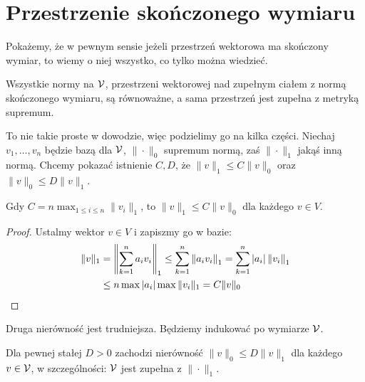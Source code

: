 \section{Przestrzenie skończonego wymiaru}
Pokażemy, że w pewnym sensie jeżeli przestrzeń wektorowa ma skończony wymiar, to wiemy o niej wszystko, co tylko można wiedzieć.

\begin{fakt}
	Wszystkie normy na $\mathcal V$, przestrzeni wektorowej nad zupełnym ciałem z normą skończonego wymiaru, są równoważne, a sama przestrzeń jest zupełna z metryką supremum.
\end{fakt}

To nie takie proste w dowodzie, więc podzielimy go na kilka części.
Niechaj $v_1, \dots, v_n$ będzie bazą dla $\mathcal V$, $\|\cdot\|_0$ supremum normą, zaś $\|\cdot\|_1$ jakąś inną normą.
Chcemy pokazać istnienie $C, D$, że $\|v\|_1 \le C \|v\|_0$ oraz $\|v\|_0 \le D \|v\|_1$.

\begin{lemat}
	Gdy $C = n \max_{1 \le i \le n} \|v_i\|_1$, to $\|v\|_1 \le C \| v \|_0$ dla każdego $v \in V$.
\end{lemat}

\begin{proof}
	Ustalmy wektor $v \in V$ i zapiszmy go w bazie:
	\begin{align*}
	\|v\|_1 & = \left\| \sum_{k=1}^n a_i v_i \right\|_1 \le  \sum_{k=1}^n \left\| a_i v_i \right\|_1 =  \sum_{k=1}^n |a_i|  \left\|  v_i \right\|_1 \\
	& \le n \max |a_i| \max \|v_i\|_1 = C \|v\|_0 \qedhere
	\end{align*}
\end{proof}

Druga nierówność jest trudniejsza.
Będziemy indukować po wymiarze $\mathcal V$.

\begin{lemat}
	Dla pewnej stałej $D > 0$ zachodzi nierówność $\|v\|_0 \le D \|v\|_1$ dla każdego $v \in \mathcal V$, w szczególności: $\mathcal V$ jest zupełna z $\|\cdot\|_1$.
\end{lemat}

